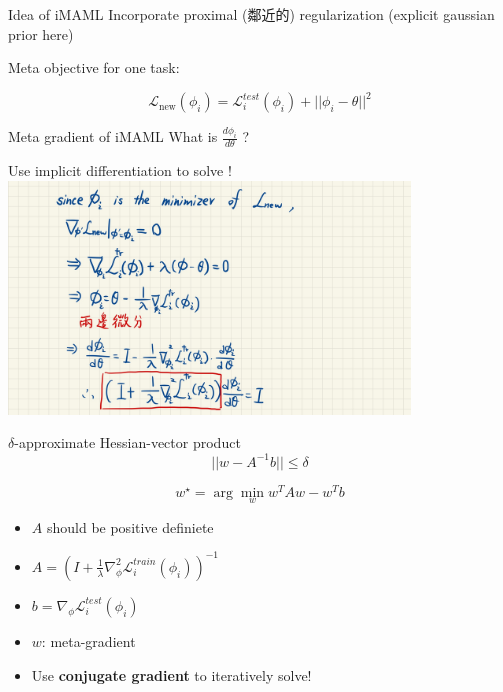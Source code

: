 \documentclass{beamer}
\begin{document}
\begin{frame}[t]{Idea of iMAML}
  Incorporate proximal (鄰近的) regularization (explicit gaussian prior here)

  Meta objective for one task:

  \begin{equation*}
    \boxed{\mathcal{L}_{\text{new}}(\phi_i) = \mathcal{L}^{test}_i(\phi_i) + ||\phi_i - \theta||^2}
  \end{equation*}
\end{frame}

\begin{frame}[t]{Meta gradient of iMAML}
  What is $\frac{d \phi_i}{d \theta}$ ?

  Use implicit differentiation to solve !
  \center \includegraphics[width=0.8\textwidth]{fig/iMAML-grad.png}
\end{frame}

\begin{frame}[t]{$\delta$-approximate Hessian-vector product}
  \begin{equation*}
    ||w - A^{-1}b|| \leq \delta
  \end{equation*}

  \begin{equation*}
    \boxed{ w^\star = \arg\min_w w^T A w - w^T b }
  \end{equation*}

  \begin{itemize}
    \item $A$ should be positive definiete
    \item $A = (I + \frac{1}{\lambda}\nabla^2_\phi\mathcal{L}^{train}_i(\phi_i))^{-1}$
    \item $b = \nabla_\phi \mathcal{L}^{test}_i(\phi_i)$
    \item $w$: meta-gradient
    \item Use \textbf{conjugate gradient} to iteratively solve!
  \end{itemize}
\end{frame}
\end{document}
